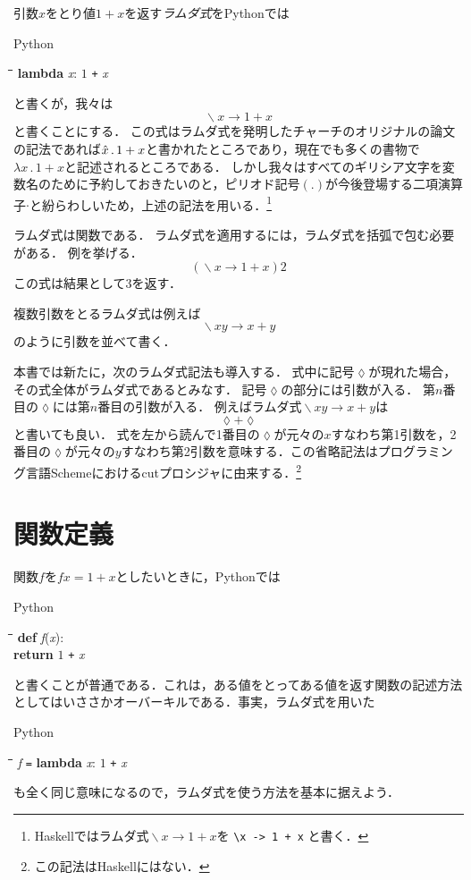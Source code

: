 \documentclass[twocolumn]{jsbook}
\newcommand{\keyword}[1]{{\emph{#1}}}
\newcommand{\code}[1]{\texttt{#1}}
\newenvironment{pythoncode}{\begin{itembox}[r]{Python}}{\end{itembox}}
\newenvironment{python}{\begin{tabbing}\hspace*{1em}\=\hspace*{1em}\=\hspace*{1em}\=\hspace*{1em}\=\kill}{\end{tabbing}}
\newcommand{\pthnId}[1]{\textit{#1}}
\newcommand{\pthnKeyword}[1]{\textbf{#1}}
\newcommand{\pthnOp}[1]{\texttt{#1}}
\DeclareMathOperator{\mathLambda}{\backslash}
\newcommand{\mathLambdaAnonymousParameter}{\lozenge}
\newcommand{\mathLambdaArrow}{\rightarrow}
\newcommand{\mathLambdaExpression}[2]{\mathLambda#1\mathLambdaArrow#2}
\begin{document}
引数$x$をとり値$1+x$を返す\keyword{ラムダ式}をPythonでは
\begin{pythoncode}
\begin{python}
\pthnKeyword{lambda} \pthnId{x}: $1$ \pthnOp{+} \pthnId{x}
\end{python}
\end{pythoncode}
と書くが，我々は$$\mathLambdaExpression{x}{1+x}$$と書くことにする．
この式はラムダ式を発明したチャーチのオリジナルの論文の記法であれば$\Hat x\,.\,1+x$と書かれたところであり，現在でも多くの書物で$\lambda x\,.\,1+x$と記述されるところである．
しかし我々はすべてのギリシア文字を変数名のために予約しておきたいのと，ピリオド記号$(.)$が今後登場する二項演算子$\cdot$と紛らわしいため，上述の記法を用いる．\footnote{Haskellではラムダ式$\mathLambdaExpression{x}{1+x}$を \code{\textbackslash x -> 1 + x} と書く．}

ラムダ式は関数である．
ラムダ式を適用するには，ラムダ式を括弧で包む必要がある．
例を挙げる．
$$\left(\mathLambdaExpression{x}{1+x}\right)2$$
この式は結果として$3$を返す．

複数引数をとるラムダ式は例えば$$\mathLambdaExpression{xy}{x+y}$$のように引数を並べて書く．

本書では新たに，次のラムダ式記法も導入する．
式中に記号$\mathLambdaAnonymousParameter$が現れた場合，その式全体がラムダ式であるとみなす．
記号$\mathLambdaAnonymousParameter$の部分には引数が入る．
第$n$番目の$\mathLambdaAnonymousParameter$には第$n$番目の引数が入る．
例えばラムダ式$\mathLambdaExpression{xy}{x+y}$は$$\mathLambdaAnonymousParameter+\mathLambdaAnonymousParameter$$と書いても良い．
式を左から読んで1番目の$\mathLambdaAnonymousParameter$が元々の$x$すなわち第1引数を，2番目の$\mathLambdaAnonymousParameter$が元々の$y$すなわち第2引数を意味する．この省略記法はプログラミング言語Schemeにおけるcutプロシジャに由来する．\footnote{この記法はHaskellにはない．}



\section{関数定義}

関数$f$を$fx=1+x$としたいときに，Pythonでは
\begin{pythoncode}
\begin{python}
\pthnKeyword{def} \pthnId{f}(\pthnId{x}):\\
\>\pthnKeyword{return} $1$ \pthnOp{+} \pthnId{x}
\end{python}
\end{pythoncode}
と書くことが普通である．これは，ある値をとってある値を返す関数の記述方法としてはいささかオーバーキルである．事実，ラムダ式を用いた
\begin{pythoncode}
\begin{python}
\pthnId{f} \pthnOp{=} \pthnKeyword{lambda} \pthnId{x}: $1$ \pthnOp{+} \pthnId{x}
\end{python}
\end{pythoncode}
も全く同じ意味になるので，ラムダ式を使う方法を基本に据えよう．
\end{document}
